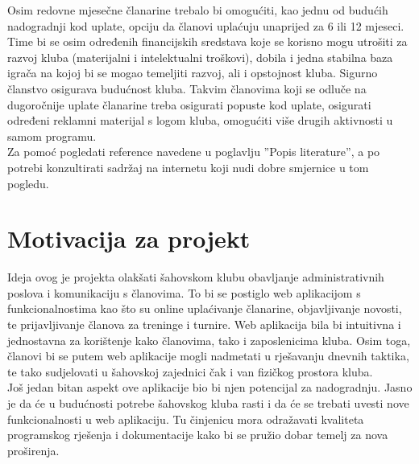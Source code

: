 		Osim redovne mjesečne članarine trebalo bi omogućiti, kao jednu od budućih nadogradnji kod uplate, opciju da članovi uplaćuju unaprijed za 6 ili 12 mjeseci. Time bi se osim određenih financijskih sredstava koje se korisno mogu utrošiti za razvoj kluba (materijalni i intelektualni troškovi), dobila i jedna stabilna baza igrača na kojoj bi se mogao temeljiti razvoj, ali i opstojnost kluba. Sigurno članstvo osigurava budućnost kluba. Takvim članovima koji se odluče na dugoročnije uplate članarine treba osigurati popuste kod uplate, osigurati određeni reklamni materijal s logom kluba, omogućiti više drugih aktivnosti u samom programu.\\
	    Za pomoć pogledati reference navedene u poglavlju ''Popis literature'', a po potrebi konzultirati sadržaj na internetu koji nudi dobre smjernice u tom pogledu.
		
		\section{Motivacija za projekt}
		Ideja ovog je projekta olakšati šahovskom klubu obavljanje administrativnih poslova i komunikaciju s članovima. To bi se postiglo web aplikacijom s funkcionalnostima kao što su online uplaćivanje članarine, objavljivanje novosti, te prijavljivanje članova za treninge i turnire. Web aplikacija bila bi intuitivna i jednostavna za korištenje kako članovima, tako i zaposlenicima kluba. Osim toga, članovi bi se putem web aplikacije mogli nadmetati u rješavanju dnevnih taktika, te tako sudjelovati u šahovskoj zajednici čak i van fizičkog prostora kluba.  \\
Još jedan bitan aspekt ove aplikacije bio bi njen potencijal za nadogradnju. Jasno je da će u budućnosti potrebe šahovskog kluba rasti i da će se trebati uvesti nove funkcionalnosti u web aplikaciju. Tu činjenicu mora odražavati kvaliteta programskog rješenja i dokumentacije kako bi se pružio dobar temelj za nova proširenja.
		
		\eject

		
	